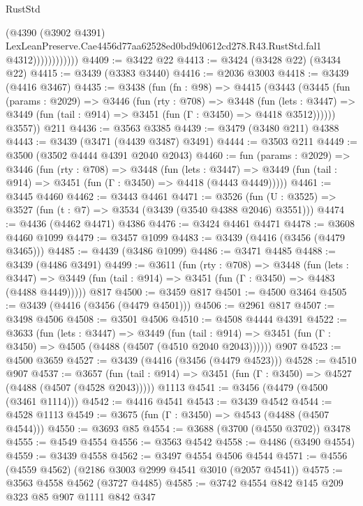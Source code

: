 \begin{lexlean}{RustStd}
\begin{coremodule}
                          (@4390
                            (@3902 @4391)
                            LexLeanPreserve.Cae4456d77aa62528ed0bd9d0612cd278.R43.RustStd.fal1
                            @4312))))))))))))
@4409 := @3422 @22
@4413 := @3424 (@3428 @22) (@3434 @22)
@4415 := @3439 (@3383 @3440)
@4416 := @2036 @3003
@4418 := @3439 (@4416 @3467)
@4435 := @3438
    (fun (fn : @98) =>
    @4415
      (@3443
        (@3445
          (fun (params : @2029) =>
          @3446
            (fun (rty : @708) =>
            @3448
              (fun (lets : @3447) =>
              @3449 (fun (tail : @914) => @3451 (fun (Γ : @3450) => @4418 @3512))))))
        @3557))
    @211
@4436 := @3563 @3385
@4439 := @3479 (@3480 @211) @4388
@4443 := @3439 (@3471 (@4439 @3487) @3491)
@4444 := @3503 @211
@4449 := @3500 (@3502 @4444 @4391 @2040 @2043)
@4460 := fun (params : @2029) =>
  @3446
    (fun (rty : @708) =>
    @3448
      (fun (lets : @3447) =>
      @3449 (fun (tail : @914) => @3451 (fun (Γ : @3450) => @4418 (@4443 @4449)))))
@4461 := @3445 @4460
@4462 := @3443 @4461
@4471 := @3526 (fun (U : @3525) => @3527 (fun (t : @7) => @3534 (@3439 (@3540 @4388 @2046) @3551)))
@4474 := @4436 (@4462 @4471) @4386
@4476 := @3424 @4461 @4471
@4478 := @3608 @4460 @1099
@4479 := @3457 @1099
@4483 := @3439 (@4416 (@3456 (@4479 @3465)))
@4485 := @4439 (@3486 @1099)
@4486 := @3471 @4485
@4488 := @3439 (@4486 @3491)
@4499 := @3611
    (fun (rty : @708) =>
    @3448
      (fun (lets : @3447) =>
      @3449 (fun (tail : @914) => @3451 (fun (Γ : @3450) => @4483 (@4488 @4449)))))
    @817
@4500 := @3459 @817
@4501 := @4500 @3464
@4505 := @3439 (@4416 (@3456 (@4479 @4501)))
@4506 := @2961 @817
@4507 := @3498 @4506
@4508 := @3501 @4506
@4510 := @4508 @4444 @4391
@4522 := @3633
    (fun (lets : @3447) =>
    @3449
      (fun (tail : @914) => @3451 (fun (Γ : @3450) => @4505 (@4488 (@4507 (@4510 @2040 @2043))))))
    @907
@4523 := @4500 @3659
@4527 := @3439 (@4416 (@3456 (@4479 @4523)))
@4528 := @4510 @907
@4537 := @3657
    (fun (tail : @914) => @3451 (fun (Γ : @3450) => @4527 (@4488 (@4507 (@4528 @2043)))))
    @1113
@4541 := @3456 (@4479 (@4500 (@3461 @1114)))
@4542 := @4416 @4541
@4543 := @3439 @4542
@4544 := @4528 @1113
@4549 := @3675 (fun (Γ : @3450) => @4543 (@4488 (@4507 @4544)))
@4550 := @3693 @85
@4554 := @3688 (@3700 (@4550 @3702)) @3478
@4555 := @4549 @4554
@4556 := @3563 @4542
@4558 := @4486 (@3490 @4554)
@4559 := @3439 @4558
@4562 := @3497 @4554 @4506 @4544
@4571 := @4556 (@4559 @4562) (@2186 @3003 @2999 @4541 @3010 (@2057 @4541))
@4575 := @3563 @4558 @4562 (@3727 @4485)
@4585 := @3742 @4554 @842 @145 @209 @323 @85 @907 @1111 @842 @347

\end{coremodule}
\end{lexlean}
